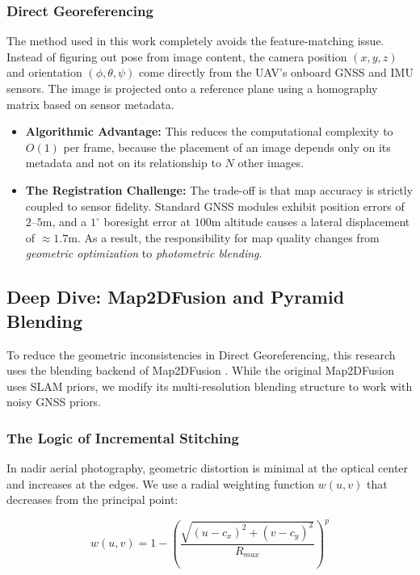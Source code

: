 \documentclass[conference]{IEEEtran}
\begin{document}
\subsubsection{Direct Georeferencing}
The method used in this work completely avoids the feature-matching issue. Instead of figuring out pose from image content, the camera position $(x, y, z)$ and orientation $(\phi, \theta, \psi)$ come directly from the UAV's onboard GNSS and IMU sensors. The image is projected onto a reference plane using a homography matrix based on sensor metadata.

\begin{itemize}
    \item \textbf{Algorithmic Advantage:} This reduces the computational complexity to $O(1)$ per frame, because the placement of an image depends only on its metadata and not on its relationship to $N$ other images.
    \item \textbf{The Registration Challenge:} The trade-off is that map accuracy is strictly coupled to sensor fidelity. Standard GNSS modules exhibit position errors of $2$--$5$m, and a $1^{\circ}$ boresight error at $100$m altitude causes a lateral displacement of $\approx 1.7$m. As a result, the responsibility for map quality changes from \textit{geometric optimization} to \textit{photometric blending}.
\end{itemize}


\subsection{Deep Dive: Map2DFusion and Pyramid Blending}
To reduce the geometric inconsistencies in Direct Georeferencing, this research uses the blending backend of Map2DFusion \cite{map2dfusion}. While the original Map2DFusion uses SLAM priors, we modify its multi-resolution blending structure to work with noisy GNSS priors.

\subsubsection{The Logic of Incremental Stitching}
In nadir aerial photography, geometric distortion is minimal at the optical center and increases at the edges. We use a radial weighting function $w(u, v)$ that decreases from the principal point:

\begin{equation} \label{eq:weighting}
w(u, v) = 1 - \left( \frac{\sqrt{(u - c_x)^2 + (v - c_y)^2}}{R_{max}} \right)^p
\end{equation}
\end{document}
